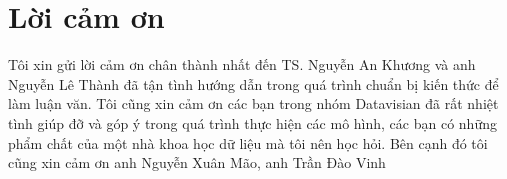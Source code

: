\chapter*{Lời cảm ơn}
Tôi xin gửi lời cảm ơn chân thành nhất đến TS. Nguyễn An Khương và anh Nguyễn Lê Thành đã tận tình hướng dẫn trong quá trình chuẩn bị kiến thức để làm luận văn. Tôi cũng xin cảm ơn các bạn trong nhóm Datavisian đã rất nhiệt tình giúp đỡ và góp ý trong quá trình thực hiện các mô hình, các bạn có những phẩm chất của một nhà khoa học dữ liệu mà tôi nên học hỏi. Bên cạnh đó tôi cũng xin cảm ơn anh Nguyễn Xuân Mão, anh Trần Đào Vinh 
